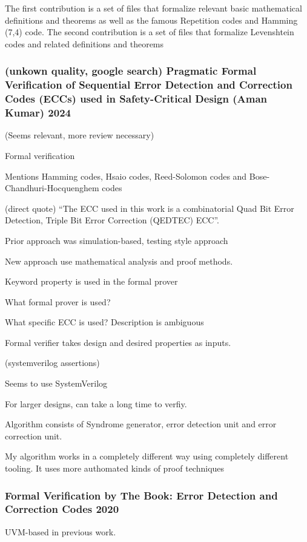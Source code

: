 \documentclass{article}
\begin{document}
The first contribution is a set of files that formalize relevant basic mathematical definitions and theorems as well as the famous Repetition codes and Hamming (7,4) code. The second contribution is a set of files that formalize Levenshtein codes and related definitions and theorems

\subsubsection{(unkown quality, google search) Pragmatic Formal Verification of Sequential Error
Detection and Correction Codes (ECCs) used in
Safety-Critical Design (Aman Kumar) 2024}

(Seems relevant, more review necessary)

Formal verification

Mentions Hamming codes, Hsaio codes, Reed-Solomon codes and Bose-Chandhuri-Hocquenghem codes

(direct quote) ``The ECC used in this work is a combinatorial Quad Bit Error Detection, Triple Bit Error Correction (QEDTEC) ECC''.

Prior approach was simulation-based, testing style approach

New approach use mathematical analysis and proof methods.

Keyword property is used in the formal prover

What formal prover is used?

What specific ECC is used? Description is ambiguous

Formal verifier takes design and desired properties as inputs.

(systemverilog assertions)

Seems to use SystemVerilog

For larger designs, can take a long time to verfiy.

Algorithm consists of Syndrome generator, error detection unit and error correction unit.

My algorithm works in a completely different way using completely different tooling. It uses more authomated kinds of proof techniques

\subsubsection{Formal Verification by The Book: Error Detection and Correction Codes 2020}

UVM-based in previous work.
\end{document}

